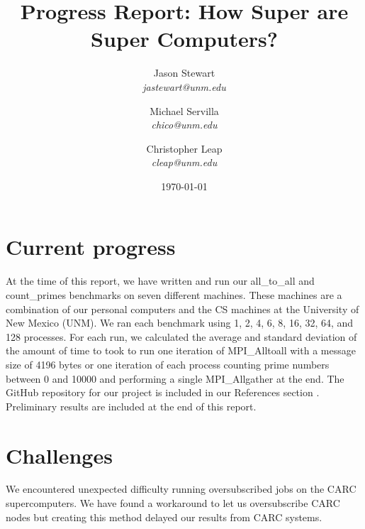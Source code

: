 \documentclass{article}
\title{Progress Report: How Super are Super Computers?}
\author{Jason Stewart\\
\textit{jastewart@unm.edu} 
\and
Michael Servilla\\
\textit{chico@unm.edu}
\and
Christopher Leap\\
\textit{cleap@unm.edu}
\date{\today}
}
\begin{document}
\maketitle
\section{Current progress}
At the time of this report, we have written and run our all\_to\_all and count\_primes benchmarks on seven different machines. These machines are a combination of our personal computers and the CS machines at the University of New Mexico (UNM). We ran each benchmark using 1, 2, 4, 6, 8, 16, 32, 64, and 128 processes. For each run, we calculated the average and standard deviation of the amount of time to took to run one iteration of MPI\_Alltoall with a message size of 4196 bytes or one iteration of each process counting prime numbers between 0 and 10000 and performing a single MPI\_Allgather at the end. The GitHub repository for our project is included in our References section \cite{repo}. Preliminary results are included at the end of this report.

\section{Challenges}
We encountered unexpected difficulty running oversubscribed jobs on the CARC supercomputers. We have found a workaround to let us oversubscribe CARC nodes but creating this method delayed our results from CARC systems.
\end{document}
